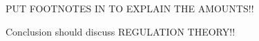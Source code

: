 \documentclass[12pt,table]{article}
\begin{document}


PUT FOOTNOTES IN TO EXPLAIN THE AMOUNTS!!













Conclusion should discuss REGULATION THEORY!! 





\end{document}
